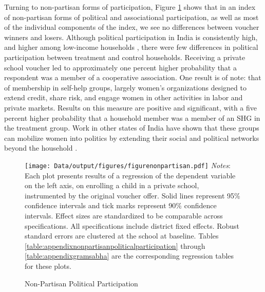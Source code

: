 \documentclass[hidelinks, 12pt, titlepage]{article}
\begin{document}
		Turning to non-partisan forms of participation, Figure \ref{fig:nonpartisan} shows that in an index of non-partisan forms of political and associational participation, as well as most of the individual components of the index, we see no differences between voucher winners and losers.  Although political participation in India is consistently high, and higher among low-income households \citep{Banerjee2011a}, there were few differences in political participation between treatment and control households.  Receiving a private school voucher led to approximately one percent higher probability that a respondent was a member of a cooperative association. One result is of note: that of membership in self-help groups, largely women's organizations designed to extend credit, share risk, and engage women in other activities in labor and private markets.  Results on this measure are positive and significant, with a five percent higher probability that a household member was a member of an SHG in the treatment group. Work in other states of India have shown that these groups can mobilize women into politics by extending their social and political networks beyond the household \citep{Prillaman2022}.

		\begin{figure}[htbp]
			\caption{Non-Partisan Political Participation\label{fig:nonpartisan}}
			\centering
			\begin{minipage}{5.5in}
				\texttt{[image: Data/output/figures/figurenonpartisan.pdf]}
				\footnotesize
				\emph{Notes}: Each plot presents results of a regression of the dependent variable on the left axis, on enrolling a child in a private school, instrumented by the original voucher offer.  Solid lines represent 95\% confidence intervals and tick marks represent 90\% confidence intervals.  Effect sizes are standardized to be comparable across specifications.  All specifications include district fixed effects.  Robust standard errors are clustered at the school at baseline. Tables \ref{table:appendixnonpartisanpoliticalparticipation} through \ref{table:appendixgramsabha} are the corresponding regression tables for these plots.
			\end{minipage}
		\end{figure}
\end{document}
